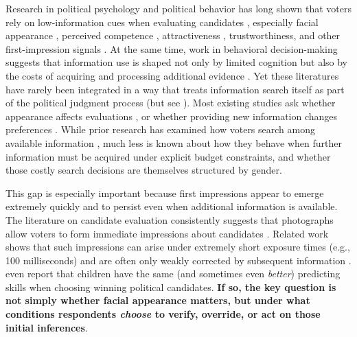 \documentclass[11pt]{article}
\begin{document}
Research in political psychology and political behavior has long shown that voters rely on low-information cues when evaluating candidates \parencite{Lau2001a}, especially facial appearance \parencite{Dion1998a,Stockemer2019a}, perceived competence \parencite{Herrmann2016}, attractiveness \parencite{Rosar2008,Dion1972a}, trustworthiness, and other first-impression signals \parencite{Bahamonde:2023}. At the same time, work in behavioral decision-making suggests that information use is shaped not only by limited cognition \parencite{Redlawsk2001} but also by the costs of acquiring and processing additional evidence \parencite{Zaller1992}. Yet these literatures have rarely been integrated in a way that treats information search itself as part of the political judgment process (but see \cite{Lau2006}). Most existing studies ask whether appearance affects evaluations \parencite{Berggren2010,Berggren2017}, or whether providing new information changes preferences \parencite{Todorov2005,Mattes2010a}. While prior research has examined how voters search among available information \parencite{Lau2006}, much less is known about how they behave when further information must be acquired under explicit budget constraints, and whether those costly search decisions are themselves structured by gender.


This gap is especially important because first impressions appear to emerge extremely quickly and to persist even when additional information is available. The literature on candidate evaluation consistently suggests that photographs allow voters to form immediate impressions about candidates \parencite{Banducci2008}. Related work shows that such impressions can arise under extremely short exposure times (e.g., 100 milliseconds) and are often only weakly corrected by subsequent information \parencite{Todorov2005,Mattes2010a}. \textcite{Antonakis2009a} even report that children have the same (and sometimes even \emph{better}) predicting skills when choosing winning political candidates. {\bf If so, the key question is not simply whether facial appearance matters, but under what conditions respondents \emph{choose} to verify, override, or act on those initial inferences}.
\end{document}
